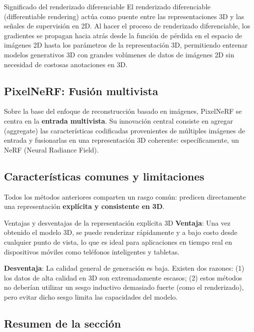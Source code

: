 \documentclass[a4paper]{article}
\begin{document}
\begin{knowledgebox}{Significado del renderizado diferenciable}
El renderizado diferenciable (differentiable rendering) actúa como puente entre las representaciones 3D y las señales de supervisión en 2D. Al hacer el proceso de renderizado diferenciable, los gradientes se propagan hacia atrás desde la función de pérdida en el espacio de imágenes 2D hasta los parámetros de la representación 3D, permitiendo entrenar modelos generativos 3D con grandes volúmenes de datos de imágenes 2D sin necesidad de costosas anotaciones en 3D.
\end{knowledgebox}

\subsection{PixelNeRF: Fusión multivista}

Sobre la base del enfoque de reconstrucción basado en imágenes, PixelNeRF se centra en la \textbf{entrada multivista}. Su innovación central consiste en agregar (aggregate) las características codificadas provenientes de múltiples imágenes de entrada y fusionarlas en una representación 3D coherente: específicamente, un NeRF (Neural Radiance Field).

\subsection{Características comunes y limitaciones}

Todos los métodos anteriores comparten un rasgo común: predicen directamente una representación \textbf{explícita y consistente en 3D}.

\begin{importantbox}{Ventajas y desventajas de la representación explícita 3D}
\textbf{Ventaja}: Una vez obtenido el modelo 3D, se puede renderizar rápidamente y a bajo costo desde cualquier punto de vista, lo que es ideal para aplicaciones en tiempo real en dispositivos móviles como teléfonos inteligentes y tabletas.

\textbf{Desventaja}: La calidad general de generación es baja. Existen dos razones: (1) los datos de alta calidad en 3D son extremadamente escasos; (2) estos métodos no deberían utilizar un sesgo inductivo demasiado fuerte (como el renderizado), pero evitar dicho sesgo limita las capacidades del modelo.
\end{importantbox}

\subsection{Resumen de la sección}
\end{document}
